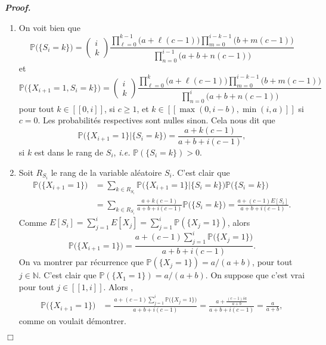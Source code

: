 \documentclass[11pt,a4paper]{article}
\newcommand{\NN}{\mathbb{N}}
\newenvironment{preuve}[1][]
{\vskip 2mm  \noindent\emph{\bf Proof#1. }}{$\Box$ \vskip 2mm}
\let\geq\geqslant
\begin{document}
\begin{preuve}
\begin{enumerate}
				\item On voit bien que 
				\[     \mathbb{P}\big(\{S_{i} = k \}\big) = \begin{pmatrix} i \\ k \end{pmatrix} \frac{\prod_{\ell=0}^{k-1} \big(a+\ell (c-1)\big) \prod_{m=0}^{i-k-1} \big(b+m(c-1)\big)}{\prod_{n=0}^{i-1} \big(a+b+n(c-1)\big)}     \]
				et
				\[     \mathbb{P}\big(\{X_{i+1} = 1, S_{i} = k \}\big) = \begin{pmatrix} i \\ k \end{pmatrix} \frac{\prod_{\ell=0}^{k} \big(a+\ell (c-1)\big) \prod_{m=0}^{i-k-1} \big(b+m(c-1)\big)}{\prod_{n=0}^{i} \big(a+b+n(c-1)\big)}     \]
				pour tout $k \in [\![ 0, i ]\!]$, si $c \geq 1$, et $k \in [\![ \max(0,i-b), \min(i,a) ]\!]$ si $c = 0$. 
				Les probabilités respectives sont nulles sinon. 
				Cela nous dit que 
				\[     \mathbb{P}\big(\{X_{i+1}=1\} | \{S_i=k\}\big) = \frac{a+k(c-1)}{a+b+i(c-1)},     \] 
				si $k$ est dans le rang de $S_{i}$, \textit{i.e.} $\mathbb{P}(\{S_i=k\})>0$. 
				
				\item Soit $R_{S_{i}}$ le rang de la variable aléatoire $S_{i}$. 
				C'est clair que 
				\begin{align*}
				\mathbb{P}\big(\{X_{i+1}=1\}\big)  &= \sum_{k \in R_{S_{i}}} \mathbb{P}\big(\{X_{i+1}=1\} | \{S_i=k\}\big) \mathbb{P}\big(\{S_i=k\}\big) 
				\\
				&= \sum_{k \in R_{S_{i}}} \frac{a+k(c-1)}{a+b+i(c-1)} \mathbb{P}\big(\{S_i=k\}\big) = \frac{a+(c-1)E[S_i]}{a+b+i(c-1)}.
				\end{align*}          
				Comme $E[S_{i}] = \sum_{j=1}^{i} E[X_{j}] = \sum_{j=1}^{i} \mathbb{P}(\{X_j=1\})$, alors 
				\[     \mathbb{P}\big(\{X_{i+1}=1\}\big)  = \frac{a+(c-1) \sum_{j=1}^{i} \mathbb{P}\big(\{X_j=1\}\big)}{a+b+i(c-1)}.     \]
				On va montrer par récurrence que $\mathbb{P}(\{X_j=1\}) = a/(a+b)$, pour tout $j \in \NN$. 
				C'est clair que $\mathbb{P}(\{X_1=1\}) = a/(a+b)$. 
				On suppose que c'est vrai pour tout $j \in [\![ 1, i ]\!]$. 
				Alors , 
				\begin{align*}
				\mathbb{P}\big(\{X_{i+1}=1\}\big)  &= \frac{a+(c-1) \sum_{j=1}^{i} \mathbb{P}\big(\{X_j=1\}\big)}{a+b+i(c-1)} = 
				\frac{a+ \frac{(c-1) i a}{a+b}}{a+b+i(c-1)} = \frac{a}{a+b},     
				\end{align*}   
				comme on voulait démontrer. 
			\end{enumerate}
		\end{preuve}
		
\end{document}
